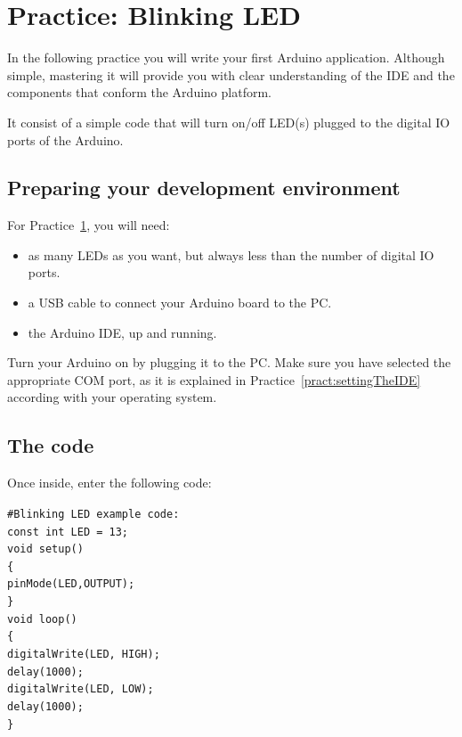 \section{Practice: Blinking LED}\label{pract:blinkingLED}
In the following practice you will write your first Arduino application. Although simple, mastering it will provide you with clear understanding of the IDE and the components that conform the Arduino platform.

It consist of a simple code that will turn on/off LED(s) plugged to the digital IO ports of the Arduino.

\subsection{Preparing your development environment}
For Practice~\ref{pract:blinkingLED}, you will need:
\begin{itemize}
 \item as many LEDs as you want, but always less than the number of digital IO ports.
 \item a USB cable to connect your Arduino board to the PC.
 \item the Arduino IDE, up and running.
\end{itemize}

Turn your Arduino on by plugging it to the PC. Make sure you have selected the appropriate COM port, as it is explained in Practice~\ref{pract:settingTheIDE} according with your operating system.

\subsection{The code} \label{code:blinkingLED}
Once inside, enter the following code:

\begin{linenumbers}
\texttt{\#Blinking LED example code:\\
const int LED = 13;  \\
void setup() \\
\{\\
	\tab pinMode(LED,OUTPUT);  \\
\}\\
void loop() \\
\{\\
	\tab digitalWrite(LED, HIGH); \\
	\tab delay(1000); \\
	\tab digitalWrite(LED, LOW); \\
	\tab delay(1000); \\
\}
}
\end{linenumbers}

